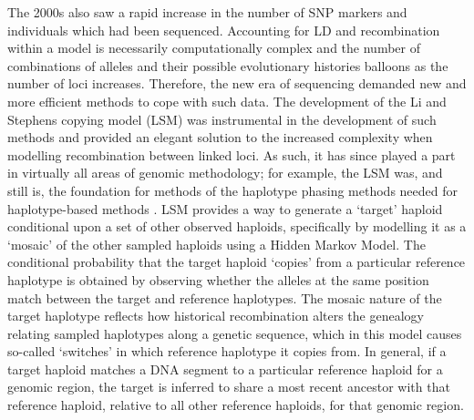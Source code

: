 The 2000s also saw a rapid increase in the number of SNP markers and individuals which had been sequenced. Accounting for LD and recombination within a model is necessarily computationally complex and the number of combinations of alleles and their possible evolutionary histories balloons as the number of loci increases. Therefore, the new era of sequencing demanded new and more efficient methods to cope with such data. The development of the Li and Stephens copying model (LSM) \cite{Li2003} was instrumental in the development of such methods \cite{song2016li} and provided an elegant solution to the increased complexity when modelling recombination between linked loci. As such, it has since played a part in virtually all areas of genomic methodology; for example, the LSM was, and still is, the foundation for methods of the haplotype phasing methods needed for haplotype-based methods \cite{stephens2003comparison, stephens2005accounting}.  LSM provides a way to generate a `target' haploid conditional upon a set of other observed haploids, specifically by modelling it as a `mosaic' of  the other sampled haploids using a Hidden Markov Model. The conditional probability that the target haploid `copies' from a particular reference haplotype is obtained by observing whether the alleles at the same position match between the target and reference haplotypes. The mosaic nature of the target haplotype reflects how historical recombination alters the genealogy relating sampled haplotypes along a genetic sequence, which in this model causes so-called `switches' in which reference haplotype it copies from. In general, if a target haploid matches a DNA segment to a particular reference haploid for a genomic region, the target is inferred to share a most recent ancestor with that reference haploid, relative to all other reference haploids, for that genomic region.

